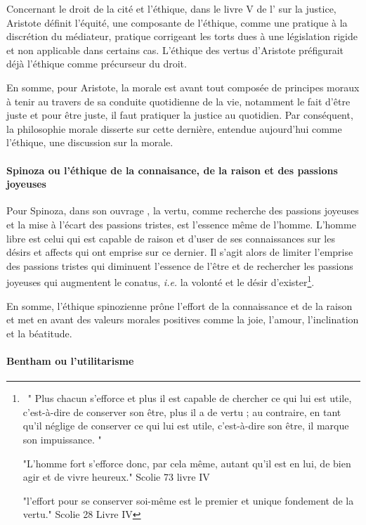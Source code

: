 Concernant le droit de la cité et l'éthique, dans le livre V de l' sur la justice, Aristote définit l'équité, une composante de l'éthique, comme une pratique à la discrétion du médiateur, pratique corrigeant les torts dues à une législation rigide et non applicable dans certains cas. L'éthique des vertus d'Aristote préfigurait déjà l'éthique comme précurseur du droit.

En somme, pour Aristote, la morale est avant tout composée de principes moraux à tenir au travers de sa conduite quotidienne de la vie, notamment le fait d'être juste et pour être juste, il faut pratiquer la justice au quotidien. Par conséquent, la philosophie morale disserte sur cette dernière, entendue aujourd'hui comme l'éthique, une discussion sur la morale.


\paragraph{Spinoza ou l'éthique de la connaisance, de la raison et des passions joyeuses}


Pour Spinoza, dans son ouvrage , la vertu, comme recherche des passions joyeuses et la mise à l'écart des passions tristes, est l'essence même de l'homme. L'homme libre est celui qui est capable de raison et d'user de ses connaissances sur les désirs et affects qui ont emprise sur ce dernier. Il s'agit alors de limiter l'emprise des passions tristes qui diminuent l'essence de l'être et de rechercher les passions joyeuses qui augmentent le conatus, \textit{i.e.} la volonté et le désir d'exister\footnote{~"
Plus chacun s'efforce et plus il est capable de chercher ce qui lui est utile, c'est-à-dire de conserver son être, plus il a de vertu ; au contraire, en tant qu'il néglige de conserver ce qui lui est utile, c'est-à-dire son être, il marque son impuissance.
"

"L'homme fort s'efforce donc, par cela même, autant qu'il est en lui, de bien agir et de vivre heureux." Scolie 73 livre IV

"l'effort pour se conserver soi-même est le premier et unique fondement de la vertu." Scolie 28 Livre IV}.



En somme, l'éthique spinozienne prône l'effort de la connaissance et de la raison et met en avant des valeurs morales positives comme la joie, l'amour, l'inclination et la béatitude. 


\paragraph{Bentham ou l'utilitarisme}


